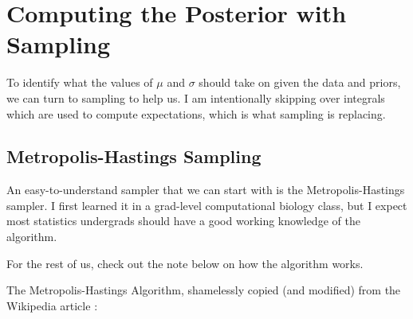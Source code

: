 \section{Computing the Posterior with Sampling}

To identify what the values of $\mu$ and $\sigma$ should take on given the data and priors, we can turn to sampling to help us. I am intentionally skipping over integrals which are used to compute expectations, which is what sampling is replacing.

\subsection{Metropolis-Hastings Sampling}

An easy-to-understand sampler that we can start with is the Metropolis-Hastings sampler. I first learned it in a grad-level computational biology class, but I expect most statistics undergrads should have a good working knowledge of the algorithm.

For the rest of us, check out the note below on how the algorithm works.

The Metropolis-Hastings Algorithm, shamelessly copied (and modified) from the Wikipedia article \cite{WikiPediaHMetropolisHastingsalgorithm2019}:

